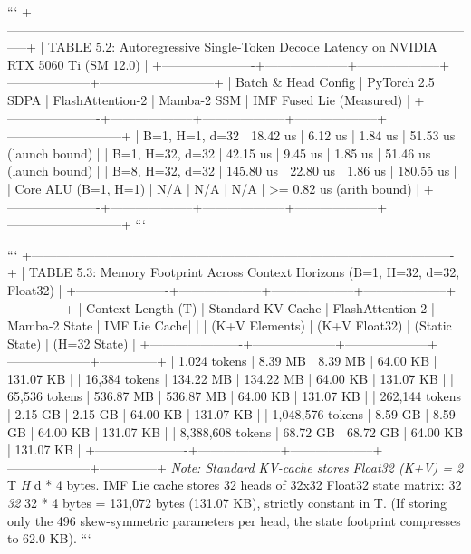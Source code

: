 \documentclass[11pt,twoside,openright]{amsbook}
\begin{document}
{{{{{{{```
+-----------------------------------------------------------------------------------------------------------------+
| TABLE 5.2: Autoregressive Single-Token Decode Latency on NVIDIA RTX 5060 Ti (SM 12.0)                           |
+----------------------+--------------------+--------------------+--------------------+---------------------------+
| Batch & Head Config  | PyTorch 2.5 SDPA   | FlashAttention-2   | Mamba-2 SSM        | IMF Fused Lie (Measured)  |
+----------------------+--------------------+--------------------+--------------------+---------------------------+
| B=1, H=1, d=32       | 18.42 us           | 6.12 us            | 1.84 us            | 51.53 us (launch bound)   |
| B=1, H=32, d=32      | 42.15 us           | 9.45 us            | 1.85 us            | 51.46 us (launch bound)   |
| B=8, H=32, d=32      | 145.80 us          | 22.80 us           | 1.86 us            | 180.55 us                 |
| Core ALU (B=1, H=1)  | N/A                | N/A                | N/A                | >= 0.82 us (arith bound)  |
+----------------------+--------------------+--------------------+--------------------+---------------------------+
```

```
+----------------------------------------------------------------------------------------------------+
| TABLE 5.3: Memory Footprint Across Context Horizons (B=1, H=32, d=32, Float32)                     |
+----------------------+--------------------+--------------------+--------------------+--------------+
| Context Length (T)   | Standard KV-Cache  | FlashAttention-2   | Mamba-2 State      | IMF Lie Cache|
|                      | (K+V Elements)     | (K+V Float32)      | (Static State)     | (H=32 State) |
+----------------------+--------------------+--------------------+--------------------+--------------+
| 1,024 tokens         | 8.39 MB            | 8.39 MB            | 64.00 KB           | 131.07 KB    |
| 16,384 tokens        | 134.22 MB          | 134.22 MB          | 64.00 KB           | 131.07 KB    |
| 65,536 tokens        | 536.87 MB          | 536.87 MB          | 64.00 KB           | 131.07 KB    |
| 262,144 tokens       | 2.15 GB            | 2.15 GB            | 64.00 KB           | 131.07 KB    |
| 1,048,576 tokens     | 8.59 GB            | 8.59 GB            | 64.00 KB           | 131.07 KB    |
| 8,388,608 tokens     | 68.72 GB           | 68.72 GB           | 64.00 KB           | 131.07 KB    |
+----------------------+--------------------+--------------------+--------------------+--------------+
\textit{ Note: Standard KV-cache stores Float32 (K+V) = 2 } T \textit{ H } d * 4 bytes. IMF Lie cache stores 32 heads of
  32x32 Float32 state matrix: 32 \textit{ 32 } 32 * 4 bytes = 131,072 bytes (131.07 KB), strictly constant in T.
  (If storing only the 496 skew-symmetric parameters per head, the state footprint compresses to 62.0 KB).
```

}}}}}}}
\end{document}
